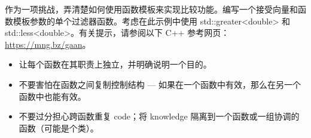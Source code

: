 作为一项挑战，弄清楚如何使用函数模板来实现比较功能。编写一个接受向量和函数模板参数的单个过滤器函数。考虑在此示例中使用 std::greater<double> 和 std::less<double>。有关提示，请参阅以下 C++ 参考网页：\url{https://mng.bz/gaan}。


\begin{itemize}
\item
让每个函数在其职责上独立，并明确说明一个目的。

\item
不要害怕在函数之间复制控制结构 — 如果在一个函数中有效，那么在另一个函数中也能有效。

\item
不要过分担心跨函数重复 code；将 knowledge 隔离到一个函数或一组协调的函数（可能是个类）。
\end{itemize}
